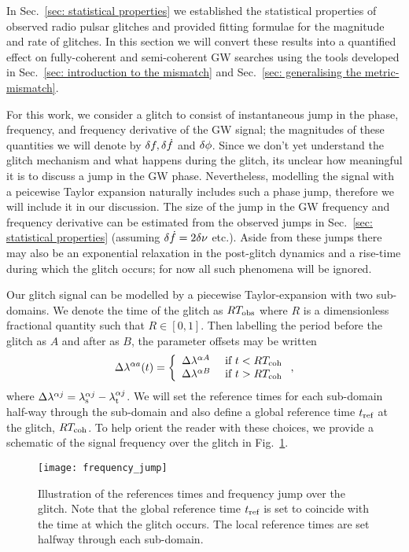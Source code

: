 \documentclass[../full_thesis/full_thesis.tex]{subfiles}
\begin{document}
In Sec.~\ref{sec: statistical properties} we established the statistical
properties of observed radio pulsar glitches and provided fitting formulae for the
magnitude and rate of glitches. In this section we will convert these
results into a quantified effect on fully-coherent and semi-coherent
GW searches using the tools developed in Sec.~\ref{sec: introduction to the
mismatch} and Sec.~\ref{sec: generalising the metric-mismatch}.

For this work, we consider a glitch to consist of instantaneous jump in the
phase, frequency, and frequency derivative of the GW signal; the magnitudes of
these quantities we will denote by $\delta f, \delta\dot{f}$ and $\delta\phi$.
Since we don't yet understand the glitch mechanism and what happens during the
glitch, its unclear how meaningful it is to discuss a jump in the GW phase.
Nevertheless, modelling the signal with
a peicewise Taylor expansion naturally includes such a phase jump, therefore
we will include it in our discussion.
The size of the jump in the GW frequency and frequency derivative can be
estimated from the observed jumps in Sec.~\ref{sec: statistical properties}
(assuming $\delta\dot{f} = 2\delta\nu$ etc.). Aside from these jumps there may also
be an exponential relaxation in the post-glitch dynamics and a rise-time during
which the glitch occurs; for now all such phenomena will be ignored.

Our glitch signal can be modelled by a piecewise Taylor-expansion with two
sub-domains. We denote the time of the glitch as $RT_{\mathrm{obs}}$ where $R$
is a dimensionless fractional quantity such that $R\in[0, 1]$.
Then labelling the period before the glitch as $A$ and after as
$B$, the parameter offsets may be written
\begin{align}
\Delta\lambda^{\alpha a}(t) = \left\{
\begin{array}{lc}
\Delta\lambda^{\alpha A} & \textrm{ if } t < RT_{\mathrm{coh}}\\
\Delta\lambda^{\alpha B} & \textrm{ if } t > RT_{\mathrm{coh}}
\end{array}
\right.,
\label{eqn: delta lambda alpha glitch}
\end{align}
where $\Delta\lambda^{\alpha j} = {\lambda}_\textrm{s}^{\alpha j} - {\lambda}_\textrm{t}^{\alpha j}$. We will set the
reference times for each sub-domain half-way through the sub-domain and also define a global
reference time $t_{\textrm{ref}}$ at the glitch, $RT_{\mathrm{coh}}$. To help orient the reader with
these choices, we provide a schematic of the signal frequency over the glitch
in Fig.~\ref{fig: frequency jump}.
\begin{figure}[htb]
\centering
\texttt{[image: frequency\_jump]}
\caption{Illustration of the references times and frequency jump over the glitch.
Note that the global reference time $t_{\textrm{ref}}$ is set to coincide with the time
at which the glitch occurs. The local reference times are set halfway through
each sub-domain.}
\label{fig: frequency jump}
\end{figure}
\end{document}
